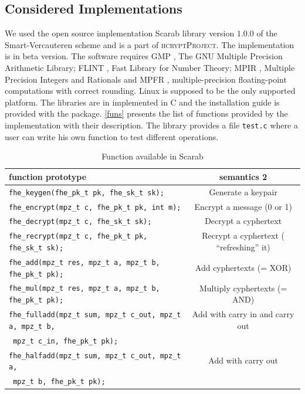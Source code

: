 \documentclass{acm_proc_article-sp}
\begin{document}
\subsection{Considered Implementations}
We used the open source implementation Scarab library \cite{hcrypt}  version $1.0.0$ of the Smart-Vercauteren scheme and is a part of \textsc{hcryptProject}. The implementation is in beta version. The software requires GMP \cite{gmp}, The GNU Multiple Precision Arithmetic Library; FLINT \cite{flint} , Fast Library for Number Theory; MPIR \cite{mpir}, Multiple Precision Integers and Rationals and MPFR \cite{mpfr}, multiple-precision floating-point computations with correct rounding. Linux is supposed to be the only supported platform. The libraries are in implemented in  C and the installation guide is provided with the package. \autoref{funs} presents the list of functions provided by the implementation with their description. The library provides a file \texttt{test.c} where a user can write his own function to test different operations.
\begin{table}
\caption{Function available in Scarab}
\begin{tabular}{|l|c||}
  \hline
  function prototype & semantics 2 \\
  \hline
 \texttt{fhe\_keygen(fhe\_pk\_t pk, fhe\_sk\_t sk);}  & 	Generate a keypair \\
\texttt{fhe\_encrypt(mpz\_t c, fhe\_pk\_t pk, int m);} &	Encrypt a message (0 or 1) \\
\texttt{fhe\_decrypt(mpz\_t c, fhe\_sk\_t sk);} &	Decrypt a cyphertext\\
\texttt{fhe\_recrypt(mpz\_t c, fhe\_pk\_t pk, fhe\_sk\_t sk); }	&Recrypt a cyphertext ( ``refreshing'' it) \\
\texttt{fhe\_add(mpz\_t res, mpz\_t a, mpz\_t b, fhe\_pk\_t pk);} &	Add cyphertexts (= XOR) \\
\texttt{fhe\_mul(mpz\_t res, mpz\_t a, mpz\_t b, fhe\_pk\_t pk);} &	Multiply cyphertexts (= AND) \\
\texttt{fhe\_fulladd(mpz\_t sum, mpz\_t c\_out, mpz\_t a, mpz\_t b,} &	Add with carry in and carry out \\
\phantom{x}\hspace{12ex} \texttt{ mpz\_t c\_in, fhe\_pk\_t pk);} & \\
\texttt{fhe\_halfadd(mpz\_t sum, mpz\_t c\_out, mpz\_t a,} &	Add with carry out \\
\phantom{x}\hspace{12ex} \texttt{ mpz\_t b, fhe\_pk\_t pk);} & \\  
\hline
\end{tabular}
\label{funs}
\end{table}
\end{document}

